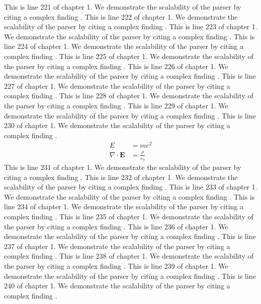 This is line 221 of chapter 1. We demonstrate the scalability of the parser by citing a complex finding \cite{ref1_221}.
This is line 222 of chapter 1. We demonstrate the scalability of the parser by citing a complex finding \cite{ref1_222}.
This is line 223 of chapter 1. We demonstrate the scalability of the parser by citing a complex finding \cite{ref1_223}.
This is line 224 of chapter 1. We demonstrate the scalability of the parser by citing a complex finding \cite{ref1_224}.
This is line 225 of chapter 1. We demonstrate the scalability of the parser by citing a complex finding \cite{ref1_225}.
This is line 226 of chapter 1. We demonstrate the scalability of the parser by citing a complex finding \cite{ref1_226}.
This is line 227 of chapter 1. We demonstrate the scalability of the parser by citing a complex finding \cite{ref1_227}.
This is line 228 of chapter 1. We demonstrate the scalability of the parser by citing a complex finding \cite{ref1_228}.
This is line 229 of chapter 1. We demonstrate the scalability of the parser by citing a complex finding \cite{ref1_229}.
This is line 230 of chapter 1. We demonstrate the scalability of the parser by citing a complex finding \cite{ref1_230}.
\begin{align*}
  E &= mc^2 \\
  \nabla \cdot \mathbf{E} &= \frac{\rho}{\varepsilon_0}
\end{align*}
This is line 231 of chapter 1. We demonstrate the scalability of the parser by citing a complex finding \cite{ref1_231}.
This is line 232 of chapter 1. We demonstrate the scalability of the parser by citing a complex finding \cite{ref1_232}.
This is line 233 of chapter 1. We demonstrate the scalability of the parser by citing a complex finding \cite{ref1_233}.
This is line 234 of chapter 1. We demonstrate the scalability of the parser by citing a complex finding \cite{ref1_234}.
This is line 235 of chapter 1. We demonstrate the scalability of the parser by citing a complex finding \cite{ref1_235}.
This is line 236 of chapter 1. We demonstrate the scalability of the parser by citing a complex finding \cite{ref1_236}.
This is line 237 of chapter 1. We demonstrate the scalability of the parser by citing a complex finding \cite{ref1_237}.
This is line 238 of chapter 1. We demonstrate the scalability of the parser by citing a complex finding \cite{ref1_238}.
This is line 239 of chapter 1. We demonstrate the scalability of the parser by citing a complex finding \cite{ref1_239}.
This is line 240 of chapter 1. We demonstrate the scalability of the parser by citing a complex finding \cite{ref1_240}.
